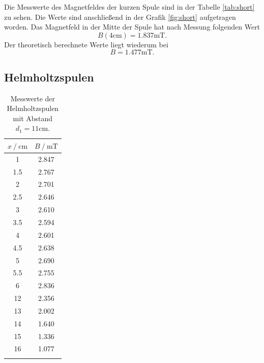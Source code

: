 Die Messwerte des Magnetfeldes der kurzen Spule sind in der Tabelle \ref{tab:short} zu sehen.
Die Werte sind anschließend in der Grafik \ref{fig:short} aufgetragen worden.
Das Magnetfeld in der Mitte der Spule hat nach Messung folgenden Wert
\begin{equation*}
  B(4\si{\centi\meter})=1.837\si{\milli\tesla} .
\end{equation*}
Der theoretisch berechnete Werte liegt wiederum bei
\begin{equation*}
  B = 1.477\si{\milli\tesla}.
\end{equation*}

\FloatBarrier

\subsection{Helmholtzspulen}

\begin{table}
\centering
\caption{Messwerte der Helmholtzspulen mit Abstand $d_1=11\si{\centi\meter}$.}
\begin{tabular}{cc}
\toprule
$x \:/\: \si{\centi\meter}$ & $B \:/\: \si{\milli\tesla}$ \\
\midrule
1 & 2.847 \\
1.5& 2.767\\
2& 2.701\\
2.5& 2.646\\
3& 2.610\\
3.5& 2.594\\
4& 2.601\\
4.5& 2.638\\
5& 2.690\\
5.5& 2.755\\
6& 2.836\\
12& 2.356\\
13& 2.002\\
14& 1.640\\
15& 1.336\\
16& 1.077\\
\bottomrule
\label{tab:helm1}
\end{tabular}
\end{table}

